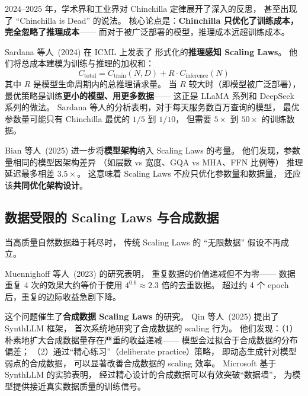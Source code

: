 2024--2025 年，学术界和工业界对 Chinchilla 定律展开了深入的反思，
甚至出现了 ``Chinchilla is Dead'' 的说法。
核心论点是：\textbf{Chinchilla 只优化了训练成本，
完全忽略了推理成本}——
而对于被广泛部署的模型，推理成本远超训练成本。

Sardana 等人~(2024) 在 ICML 上发表了%
形式化的\textbf{推理感知 Scaling Laws}。
他们将总成本建模为训练与推理的加权和：
\begin{equation}
  C_{\mathrm{total}} = C_{\mathrm{train}}(N, D)
  + R \cdot C_{\mathrm{inference}}(N)
  \label{eq:inference-aware}
\end{equation}
其中 $R$ 是模型生命周期内的总推理请求量。
当 $R$ 较大时（即模型被广泛部署），
最优策略是训练\textbf{更小的模型、用更多数据}——
这正是 LLaMA 系列和 DeepSeek 系列的做法。
Sardana 等人的分析表明，对于每天服务数百万查询的模型，
最优参数量可能只有 Chinchilla 最优的 $1/5$ 到 $1/10$，
但需要 $5\times$ 到 $50\times$ 的训练数据。

Bian 等人~(2025) 进一步将\textbf{模型架构}纳入 Scaling Laws 的考量。%
他们发现，参数量相同的模型因架构差异
（如层数 vs 宽度、GQA vs MHA、FFN 比例等）
推理延迟最多相差 $3.5\times$。
这意味着 Scaling Laws 不应只优化参数量和数据量，
还应该\textbf{共同优化架构设计}。

\subsection{数据受限的 Scaling Laws 与合成数据}
\label{sec:data-constrained}

当高质量自然数据趋于耗尽时，
传统 Scaling Laws 的 ``无限数据'' 假设不再成立。

Muennighoff 等人~(2023) 的研究表明，%
重复数据的价值递减但不为零——
数据重复 4 次的效果大约等价于使用 $4^{0.6} \approx 2.3$ 倍的去重数据。
超过约 4 个 epoch 后，重复的边际收益急剧下降。

这个问题催生了\textbf{合成数据 Scaling Laws} 的研究。
Qin 等人~(2025) 提出了 SynthLLM 框架，%
首次系统地研究了合成数据的 scaling 行为。
他们发现：（1）朴素地扩大合成数据量存在严重的收益递减——
模型会过拟合于合成数据的分布偏差；
（2）通过``精心练习''（deliberate practice）策略，
即动态生成针对模型弱点的合成数据，
可以显著改善合成数据的 scaling 效率。
Microsoft 基于 SynthLLM 的实验表明，
经过精心设计的合成数据可以有效突破``数据墙''，
为模型提供接近真实数据质量的训练信号。

